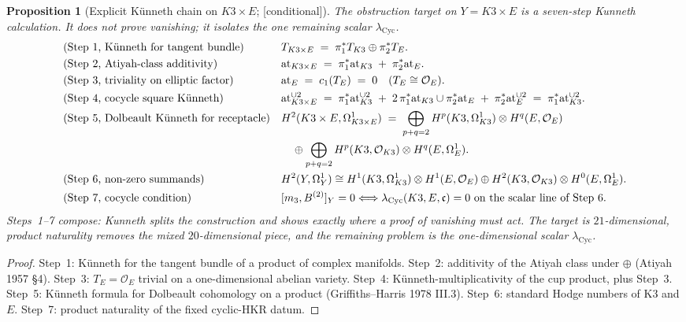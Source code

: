 \documentclass[11pt,reqno]{amsart}
\theoremstyle{plain}
\newtheorem{proposition}[theorem]{Proposition}
\theoremstyle{definition}
\theoremstyle{remark}
\providecommand{\ClaimStatusConditional}{\textnormal{[conditional]}}
\newcommand{\cO}{\mathcal{O}}
\newcommand{\at}{\mathrm{at}}
\begin{document}
\begin{proposition}[Explicit K\"unneth chain on $K3 \times E$; \ClaimStatusConditional]
\label{prop:k3e-kunneth-chain}
The obstruction target on $Y=K3\times E$ is a seven-step Kunneth calculation. It does not prove vanishing; it isolates the one remaining scalar $\lambda_{\mathrm{Cyc}}$.
\begin{align*}
&\textup{(Step 1, K\"unneth for tangent bundle)} && T_{K3 \times E} \;=\; \pi_1^* T_{K3} \oplus \pi_2^* T_E. \\
&\textup{(Step 2, Atiyah-class additivity)} && \at_{K3 \times E} \;=\; \pi_1^* \at_{K3} \;+\; \pi_2^* \at_E. \\
&\textup{(Step 3, triviality on elliptic factor)} && \at_E \;=\; c_1(T_E) \;=\; 0 \quad (T_E \cong \cO_E). \\
&\textup{(Step 4, cocycle square K\"unneth)} && \at_{K3 \times E}^{\cup 2} \;=\; \pi_1^*\at_{K3}^{\cup 2} \;+\; 2\,\pi_1^*\at_{K3}\cup\pi_2^*\at_E \;+\; \pi_2^*\at_E^{\cup 2} \;=\; \pi_1^*\at_{K3}^{\cup 2}. \\
&\textup{(Step 5, Dolbeault K\"unneth for receptacle)} && H^2(K3 \times E, \Omega^1_{K3 \times E}) \;=\; \bigoplus_{p+q=2} H^p(K3, \Omega^1_{K3}) \otimes H^q(E, \cO_E)\\
&&&\quad \oplus \bigoplus_{p+q=2} H^p(K3, \cO_{K3}) \otimes H^q(E, \Omega^1_E). \\
&\textup{(Step 6, non-zero summands)} && H^2(Y,\Omega^1_Y)
\cong H^1(K3,\Omega^1_{K3})\otimes H^1(E,\cO_E)
\oplus H^2(K3,\cO_{K3})\otimes H^0(E,\Omega^1_E). \\
&\textup{(Step 7, cocycle condition)} && [m_3, B^{(2)}]_{Y}=0
\Longleftrightarrow
\lambda_{\mathrm{Cyc}}(K3,E,\mathfrak c)=0
\text{ on the scalar line of Step 6.}
\end{align*}
Steps~1--7 compose: Kunneth splits the construction and shows exactly
where a proof of vanishing must act. The target is $21$-dimensional,
product naturality removes the mixed $20$-dimensional piece, and the
remaining problem is the one-dimensional scalar
$\lambda_{\mathrm{Cyc}}$.
\end{proposition}

\begin{proof}
Step~1: K\"unneth for the tangent bundle of a product of complex
manifolds. Step~2: additivity of the Atiyah class under $\oplus$
(Atiyah 1957 \S4). Step~3: $T_E = \cO_E$ trivial on a
one-dimensional abelian variety. Step~4:
K\"unneth-multiplicativity of the cup product, plus Step~3. Step~5:
K\"unneth formula for Dolbeault cohomology on a product
(Griffiths--Harris 1978 III.3). Step~6: standard Hodge numbers of K3
and $E$. Step~7: product naturality of the fixed cyclic-HKR datum.
\end{proof}
\end{document}
